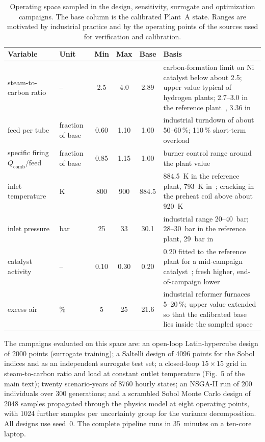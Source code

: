 \documentclass[final,3p,times]{elsarticle}
\begin{document}
\begin{table}[h]
\centering\footnotesize
\caption{Operating space sampled in the design, sensitivity, surrogate and optimization campaigns. The base column is the calibrated Plant~A state. Ranges are motivated by industrial practice and by the operating points of the sources used for verification and calibration.}
\label{tab:ranges}
\begin{tabular}{llccc p{5.6cm}}
\toprule
Variable & Unit & Min & Max & Base & Basis \\
\midrule
steam-to-carbon ratio & -- & 2.5 & 4.0 & 2.89 & carbon-formation limit on Ni catalyst below about 2.5; upper value typical of hydrogen plants; 2.7--3.0 in the reference plant~\cite{latham2011}, 3.36 in~\cite{xu1989b} \\
feed per tube & fraction of base & 0.60 & 1.10 & 1.00 & industrial turndown of about 50--60\,\%; 110\,\% short-term overload \\
specific firing $Q_{\mathrm{comb}}$/feed & fraction of base & 0.85 & 1.15 & 1.00 & burner control range around the plant value \\
inlet temperature & K & 800 & 900 & 884.5 & 884.5~K in the reference plant, 793~K in~\cite{xu1989b}; cracking in the preheat coil above about 920~K \\
inlet pressure & bar & 25 & 33 & 30.1 & industrial range 20--40~bar; 28--30~bar in the reference plant, 29~bar in~\cite{xu1989b} \\
catalyst activity & -- & 0.10 & 0.30 & 0.20 & 0.20 fitted to the reference plant for a mid-campaign catalyst~\cite{latham2011}; fresh higher, end-of-campaign lower \\
excess air & \% & 5 & 25 & 21.6 & industrial reformer furnaces 5--20\,\%; upper value extended so that the calibrated base lies inside the sampled space \\
\bottomrule
\end{tabular}
\end{table}

The campaigns evaluated on this space are: an open-loop Latin-hypercube design of 2000 points (surrogate training); a Saltelli design of 4096 points for the Sobol indices and as an independent surrogate test set; a closed-loop $15 \times 15$ grid in steam-to-carbon ratio and load at constant outlet temperature (Fig.~5 of the main text); twenty scenario-years of 8760 hourly states; an NSGA-II run of 200 individuals over 300 generations; and a scrambled Sobol Monte Carlo design of 2048 samples propagated through the physics model at eight operating points, with 1024 further samples per uncertainty group for the variance decomposition. All designs use seed~0. The complete pipeline runs in 35~minutes on a ten-core laptop.
\end{document}
